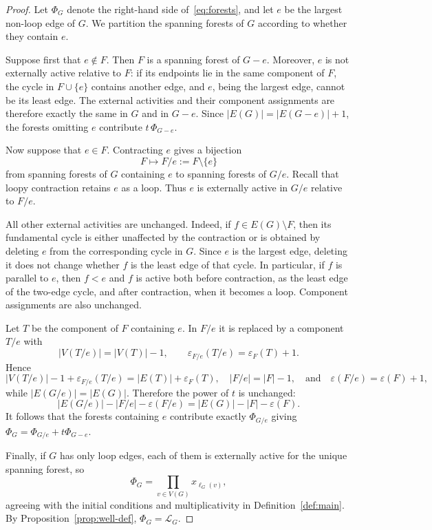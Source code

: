 \documentclass[11pt]{article}
\theoremstyle{plain}
\theoremstyle{definition}
\renewcommand{\mathcal}{\mathscr}
\newcommand{\LL}{\mathcal{L}}    %
\newcommand{\eps}{\varepsilon}
\numberwithin{equation}{section}
\begin{document}
\begin{proof}
 Let $\Phi_G$ denote the right-hand side of~\eqref{eq:forests}, and let $e$ be the largest non-loop edge of $G$.
 We partition the spanning forests of $G$ according to whether they contain $e$.

Suppose first that $e\notin F$.  Then $F$ is a spanning forest of $G-e$.
Moreover, $e$ is not externally active relative to $F$: if its endpoints lie
in the same component of $F$, the cycle in $F\cup\{e\}$ contains another
edge, and $e$, being the largest edge, cannot be its least edge.
The external activities and their component assignments are therefore exactly
the same in $G$ and in $G-e$.  Since
$|E(G)|=|E(G-e)|+1$, the forests omitting $e$ contribute  $ t\,\Phi_{G-e}$.

Now suppose that $e\in F$.  Contracting $e$ gives a bijection
\[
   F\longmapsto F/e:=F\setminus\{e\}
\]
from spanning forests of $G$ containing $e$ to spanning forests of $G/e$.
Recall that loopy contraction retains $e$ as a loop.  Thus $e$ is externally
active in $G/e$ relative to $F/e$.

All other external activities are unchanged.  Indeed, if $f\in E(G)\setminus F$, then its fundamental cycle is either unaffected by the
contraction or is obtained by deleting $e$ from the corresponding cycle in
$G$.  Since $e$ is the largest edge, deleting it does not change whether
$f$ is the least edge of that cycle.  In particular, if $f$ is parallel to
$e$, then $f<e$ and $f$ is active both before contraction, as the least edge
of the two-edge cycle, and after contraction, when it becomes a loop.
Component assignments are also unchanged.

Let $T$ be the component of $F$ containing $e$.  In $F/e$ it is replaced by a component $T/e$ with
\[
   |V(T/e)|=|V(T)|-1,
   \qquad
   \eps_{F/e}(T/e)=\eps_F(T)+1.
\]
Hence
\[
 |V(T/e)|-1+\eps_{F/e}(T/e)  =  |E(T)|+\eps_F(T),
\quad |F/e|=|F|-1, \quad \text{and}  \quad  \eps(F/e)=\eps(F)+1,
\]
while $|E(G/e)|=|E(G)|$.  Therefore the power of $t$ is unchanged:
\[
 |E(G/e)|-|F/e|-\eps(F/e)  =  |E(G)|-|F|-\eps(F).
\]
It follows that the forests containing $e$ contribute exactly $\Phi_{G/e}$ giving
$ \Phi_G=\Phi_{G/e}+t\Phi_{G-e}. $

Finally, if $G$ has only loop edges, each of them is externally active for the unique spanning forest, so
\[
   \Phi_G=\prod_{v\in V(G)}x_{\ell_G(v)},
\]
agreeing with the initial
conditions and multiplicativity in Definition~\ref{def:main}.  By
Proposition~\ref{prop:well-def}, $\Phi_G=\LL_G$.
\end{proof}
\end{document}
